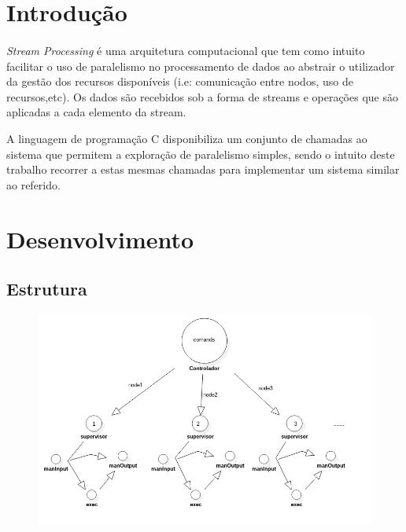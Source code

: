 \documentclass[12pt]{article}
\begin{document}
\section{Introdução}
\paragraph{}
\textit{Stream Processing} é uma arquitetura computacional que tem como intuito facilitar o uso de paralelismo no processamento de dados ao abstrair o utilizador da gestão dos recursos disponíveis (i.e: comunicação entre nodos, uso de recursos,etc). Os dados são recebidos sob a forma de streams e operações que são aplicadas a cada elemento da stream. 

A linguagem de programação C disponibiliza um conjunto de chamadas ao sistema que permitem a exploração de paralelismo simples, sendo o intuito deste trabalho recorrer a estas mesmas chamadas para implementar um sistema similar ao referido.


\newpage


\section{Desenvolvimento} 

\subsection{Estrutura}
\begin{figure}[ht!]
\centering
\includegraphics[width=120mm]{graph.jpg}
\caption{}
\end{figure}
\end{document}
